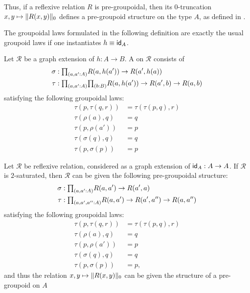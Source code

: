 Thus, if a reflexive relation $R$ is pre-groupoidal, then its $0$-truncation $x,y\mapsto\trunc{0}{R(x,y)}$ defines a pre-groupoid structure on the type $A$, as defined in \cite{AhrensKapulkinShulman}. 

The groupoidal laws formulated in the following definition are exactly the usual groupoid laws if one instantiates $h\jdeq \idfunc[A]$. 

\begin{defn}
Let $\mathcal{R}$ be a graph extension of $h:A\to B$. A  on $\mathcal{R}$ consists of
\begin{align*}
\sigma & : \prd{a,a':A} R(a,h(a'))\to R(a',h(a)) \\
\tau & : \prd{a,a':A}{b:B} R(a,h(a'))\to R(a',b)\to R(a,b)
\end{align*}
satisfying the following groupoidal laws:
\begin{align*}
\tau(p,\tau(q,r)) & =\tau(\tau(p,q),r) \tag{associativity}\\
\tau(\rho(a),q) & =q \tag{left unit law}\\
\tau(p,\rho(a')) & =p \tag{right unit law}\\
\tau(\sigma(q),q) & =q \tag{left inverse law}\\
\tau(p,\sigma(p)) & =p \tag{right inverse law}
\end{align*}
\end{defn}

\begin{thm}
Let $\mathcal{R}$ be reflexive relation, considered as a graph extension of $\idfunc[A]:A\to A$. If $\mathcal{R}$ is $2$-saturated, then $\mathcal{R}$ can be given the following pre-groupoidal structure:
\begin{align*}
\sigma & : \prd{a,a':A} R(a,a')\to R(a',a) \\
\tau & : \prd{a,a',a'':A} R(a,a')\to R(a',a'')\to R(a,a'')
\end{align*}
satisfying the following groupoidal laws:
\begin{align*}
\tau(p,\tau(q,r)) & =\tau(\tau(p,q),r) \tag{associativity}\\
\tau(\rho(a),q) & =q \tag{left unit law}\\
\tau(p,\rho(a')) & =p \tag{right unit law}\\
\tau(\sigma(q),q) & =q \tag{left inverse law}\\
\tau(p,\sigma(p)) & =p, \tag{right inverse law}
\end{align*}
and thus the relation $x,y\mapsto \trunc{0}{R(x,y)}$ can be given the structure of a pre-groupoid on $A$
\end{thm}

